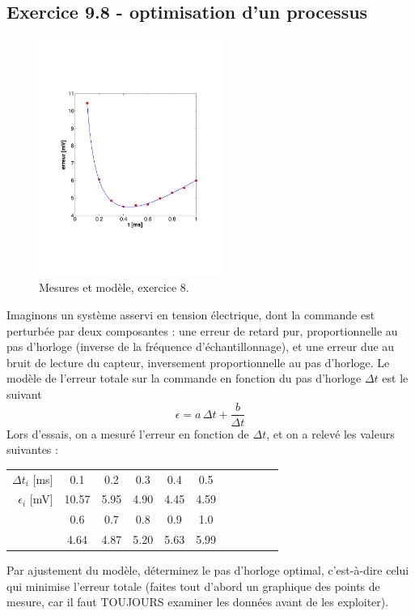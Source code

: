 \newpage

\subsection*{Exercice 9.8 - optimisation d'un processus}

\begin{figure}
    \centering
    \vspace{-5mm}
    \includegraphics[width=6cm]{assets/figures/exe9fig1serie2.pdf}
    \caption{Mesures et modèle, exercice 8.}
    \label{fig:exe9}
\end{figure}
Imaginons un système asservi en tension électrique, dont la commande est perturbée par deux composantes : une erreur de retard pur, proportionnelle au pas d'horloge (inverse de la fréquence d'échantillonnage), et une erreur due au bruit de lecture du capteur, inversement proportionnelle au pas d'horloge. Le modèle de l'erreur totale sur la commande en fonction du pas d'horloge $\Delta t$ est le suivant
$$
    \epsilon=a\,\Delta t+\frac{b}{\Delta t}
$$
Lors d'essais, on a mesuré l'erreur en fonction de $\Delta t$, et on a relevé les valeurs suivantes :
\begin{center}
    \hspace{6cm}\begin{tabular}{r|cccccccccc}
        $\Delta t_i$ [ms] & 0.1   & 0.2  & 0.3  & 0.4  & 0.5  \\
        $\epsilon_i$ [mV] & 10.57 & 5.95 & 4.90 & 4.45 & 4.59 \\
                          & 0.6   & 0.7  & 0.8  & 0.9  & 1.0  \\
                          & 4.64  & 4.87 & 5.20 & 5.63 & 5.99
    \end{tabular}
\end{center}

Par ajustement du modèle, déterminez le pas d'horloge optimal, c'est-à-dire celui qui minimise l'erreur totale (faites tout d'abord un graphique des points de mesure, car il faut TOUJOURS examiner les données avant de les exploiter).
